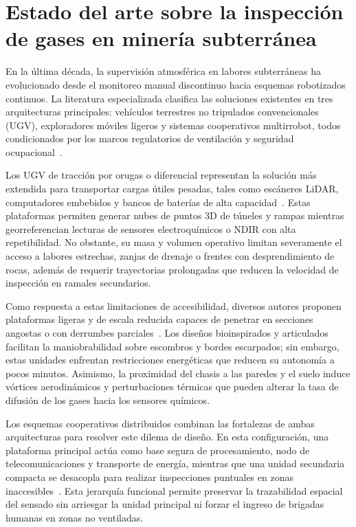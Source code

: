 \section{Estado del arte sobre la inspección de gases en minería subterránea}

En la última década, la supervisión atmosférica en labores subterráneas ha evolucionado desde el monitoreo manual discontinuo hacia esquemas robotizados continuos. La literatura especializada clasifica las soluciones existentes en tres arquitecturas principales: vehículos terrestres no tripulados convencionales (UGV), exploradores móviles ligeros y sistemas cooperativos multirrobot, todos condicionados por los marcos regulatorios de ventilación y seguridad ocupacional~\cite{MINEM_DS024_2016, OSINERGMIN_BoletinGSM_2020, OSINERGMIN_BoletinGSM_Ventilacion_2020}.

Los UGV de tracción por orugas o diferencial representan la solución más extendida para transportar cargas útiles pesadas, tales como escáneres LiDAR, computadores embebidos y bancos de baterías de alta capacidad~\cite{AdaptiveControl_Mines_2025, KimChoi_2025_MineMapping, AdvancesMining_2023}. Estas plataformas permiten generar nubes de puntos 3D de túneles y rampas mientras georreferencian lecturas de sensores electroquímicos o NDIR con alta repetibilidad. No obstante, su masa y volumen operativo limitan severamente el acceso a labores estrechas, zanjas de drenaje o frentes con desprendimiento de rocas, además de requerir trayectorias prolongadas que reducen la velocidad de inspección en ramales secundarios.

Como respuesta a estas limitaciones de accesibilidad, diversos autores proponen plataformas ligeras y de escala reducida capaces de penetrar en secciones angostas o con derrumbes parciales~\cite{InsectInspired_2020, FlappingFlight_2021, AdvancesMining_2023}. Los diseños bioinspirados y articulados facilitan la maniobrabilidad sobre escombros y bordes escarpados; sin embargo, estas unidades enfrentan restricciones energéticas que reducen su autonomía a pocos minutos. Asimismo, la proximidad del chasis a las paredes y el suelo induce vórtices aerodinámicos y perturbaciones térmicas que pueden alterar la tasa de difusión de los gases hacia los sensores químicos.

Los esquemas cooperativos distribuidos combinan las fortalezas de ambas arquitecturas para resolver este dilema de diseño. En esta configuración, una plataforma principal actúa como base segura de procesamiento, nodo de telecomunicaciones y transporte de energía, mientras que una unidad secundaria compacta se desacopla para realizar inspecciones puntuales en zonas inaccesibles~\cite{AdvancesMining_2023}. Esta jerarquía funcional permite preservar la trazabilidad espacial del sensado sin arriesgar la unidad principal ni forzar el ingreso de brigadas humanas en zonas no ventiladas.

